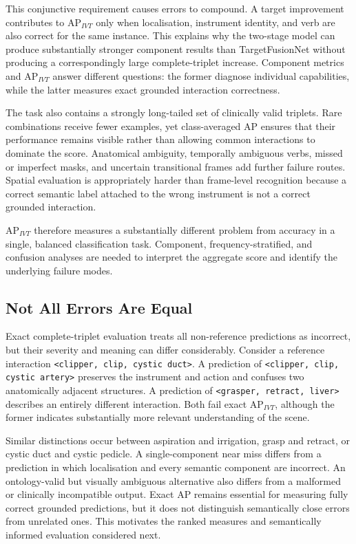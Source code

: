This conjunctive requirement causes errors to compound. A target improvement contributes to AP$_{IVT}$ only when localisation, instrument identity, and verb are also correct for the same instance. This explains why the two-stage model can produce substantially stronger component results than TargetFusionNet without producing a correspondingly large complete-triplet increase. Component metrics and AP$_{IVT}$ answer different questions: the former diagnose individual capabilities, while the latter measures exact grounded interaction correctness.

The task also contains a strongly long-tailed set of clinically valid triplets. Rare combinations receive fewer examples, yet class-averaged AP ensures that their performance remains visible rather than allowing common interactions to dominate the score. Anatomical ambiguity, temporally ambiguous verbs, missed or imperfect masks, and uncertain transitional frames add further failure routes. Spatial evaluation is appropriately harder than frame-level recognition because a correct semantic label attached to the wrong instrument is not a correct grounded interaction.

AP$_{IVT}$ therefore measures a substantially different problem from accuracy in a single, balanced classification task. Component, frequency-stratified, and confusion analyses are needed to interpret the aggregate score and identify the underlying failure modes.

\subsection{Not All Errors Are Equal}
\label{sec:discussion-unequal-errors}

Exact complete-triplet evaluation treats all non-reference predictions as incorrect, but their severity and meaning can differ considerably. Consider a reference interaction \texttt{<clipper, clip, cystic duct>}. A prediction of \texttt{<clipper, clip, cystic artery>} preserves the instrument and action and confuses two anatomically adjacent structures. A prediction of \texttt{<grasper, retract, liver>} describes an entirely different interaction. Both fail exact AP$_{IVT}$, although the former indicates substantially more relevant understanding of the scene.

Similar distinctions occur between aspiration and irrigation, grasp and retract, or cystic duct and cystic pedicle. A single-component near miss differs from a prediction in which localisation and every semantic component are incorrect. An ontology-valid but visually ambiguous alternative also differs from a malformed or clinically incompatible output. Exact AP remains essential for measuring fully correct grounded predictions, but it does not distinguish semantically close errors from unrelated ones. This motivates the ranked measures and semantically informed evaluation considered next.

